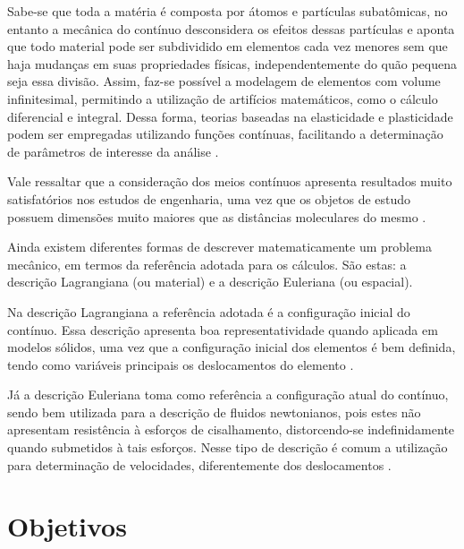 \documentclass[_ArquivoPrincipal.tex]{subfiles}
\begin{document}
Sabe-se que toda a matéria é composta por átomos e partículas subatômicas, no entanto a mecânica do contínuo desconsidera os efeitos dessas partículas e aponta que todo material pode ser subdividido em elementos cada vez menores sem que haja mudanças em suas propriedades físicas, independentemente do quão pequena seja essa divisão. Assim, faz-se possível a modelagem de elementos com volume infinitesimal, permitindo a utilização de artifícios matemáticos, como o cálculo diferencial e integral. Dessa forma, teorias baseadas na elasticidade e plasticidade podem ser empregadas utilizando funções contínuas, facilitando a determinação de parâmetros de interesse da análise \cite{irgens2008continuum, lai2009introduction, malvern1969introduction}.

Vale ressaltar que a consideração dos meios contínuos apresenta resultados muito satisfatórios nos estudos de engenharia, uma vez que os objetos de estudo possuem dimensões muito maiores que as distâncias moleculares do mesmo \cite{malvern1969introduction, mase2009continuum}.

Ainda existem diferentes formas de descrever matematicamente um problema mecânico, em termos da referência adotada para os cálculos. São estas: a descrição Lagrangiana (ou material) e a descrição Euleriana (ou espacial).

Na descrição Lagrangiana a referência adotada é a configuração inicial do contínuo. Essa descrição apresenta boa representatividade quando aplicada em modelos sólidos, uma vez que a configuração inicial dos elementos é bem definida, tendo como variáveis principais os deslocamentos do elemento \cite{sanches2014fluid, fernandes2019ale}.

Já a descrição Euleriana toma como referência a configuração atual do contínuo, sendo bem utilizada para a descrição de fluidos newtonianos, pois estes não apresentam resistência à esforços de cisalhamento, distorcendo-se indefinidamente quando submetidos à tais esforços. Nesse tipo de descrição é comum a utilização para determinação de velocidades, diferentemente dos deslocamentos \cite{sanches2014fluid, fernandes2019ale}.

\section{Objetivos}
\end{document}
